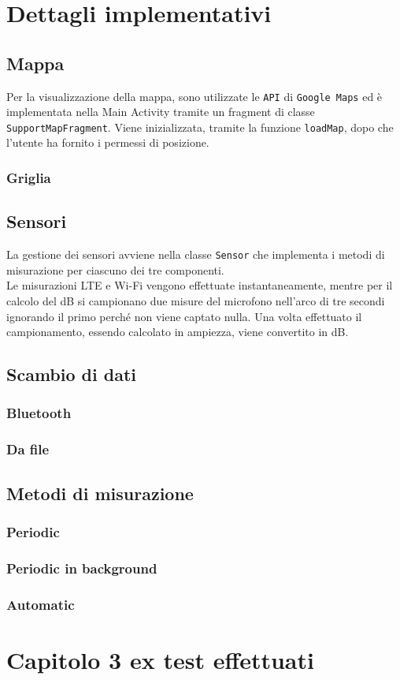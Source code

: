 \documentclass[11pt]{article}
\begin{document}
\section{Dettagli implementativi}
\subsection{Mappa}
Per la visualizzazione della mappa, sono utilizzate le \texttt{API} di \texttt{Google Maps} ed è implementata nella Main Activity tramite un fragment di classe \texttt{SupportMapFragment}. Viene inizializzata, tramite la funzione \texttt{loadMap}, dopo che l'utente ha fornito i permessi di posizione.
\subsubsection{Griglia}
\subsection{Sensori}
La gestione dei sensori avviene nella classe \texttt{Sensor} che implementa i metodi di misurazione per ciascuno dei tre componenti. \\
Le misurazioni LTE e Wi-Fi vengono effettuate instantaneamente, mentre per il calcolo del dB si campionano due misure del microfono nell'arco di tre secondi ignorando il primo perché non viene captato nulla. Una volta effettuato il campionamento, essendo calcolato in ampiezza, viene convertito in dB.
\subsection{Scambio di dati}
\subsubsection{Bluetooth}
\subsubsection{Da file}
\subsection{Metodi di misurazione} %
\subsubsection{Periodic}
\subsubsection{Periodic in background}
\subsubsection{Automatic}
\section{Capitolo 3 ex test effettuati}
\end{document}
